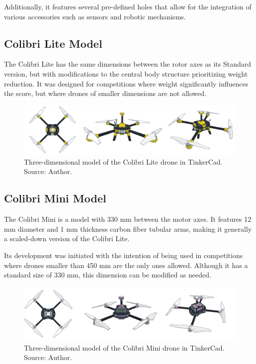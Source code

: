\documentclass[conference]{IEEEtran}
\begin{document}
Additionally, it features several pre-defined holes that allow for the integration of various accessories such as sensors and robotic mechanisms.

\subsection{Colibri Lite Model}

The Colibri Lite has the same dimensions between the rotor axes as its Standard version, but with modifications to the central body structure prioritizing weight reduction. It was designed for competitions where weight significantly influences the score, but where drones of smaller dimensions are not allowed.

\begin{figure}[!htb]
    \centering
    \includegraphics[scale=0.14]{img/Colibri-lite.png} 
    \caption{Three-dimensional model of the Colibri Lite drone in TinkerCad. Source: Author.}
    \label{fig:my_label}
\end{figure}

\subsection{Colibri Mini Model}
The Colibri Mini is a model with 330 mm between the motor axes. It features 12 mm diameter and 1 mm thickness carbon fiber tubular arms, making it generally a scaled-down version of the Colibri Lite.

Its development was initiated with the intention of being used in competitions where drones smaller than 450 mm are the only ones allowed. Although it has a standard size of 330 mm, this dimension can be modified as needed.

\begin{figure}[!htb]
    \centering
    \includegraphics[scale=0.14]{img/Colibri-mini.png} 
    \caption{Three-dimensional model of the Colibri Mini drone in TinkerCad. Source: Author.}
    \label{fig:ColibriMini}
\end{figure}
\end{document}

